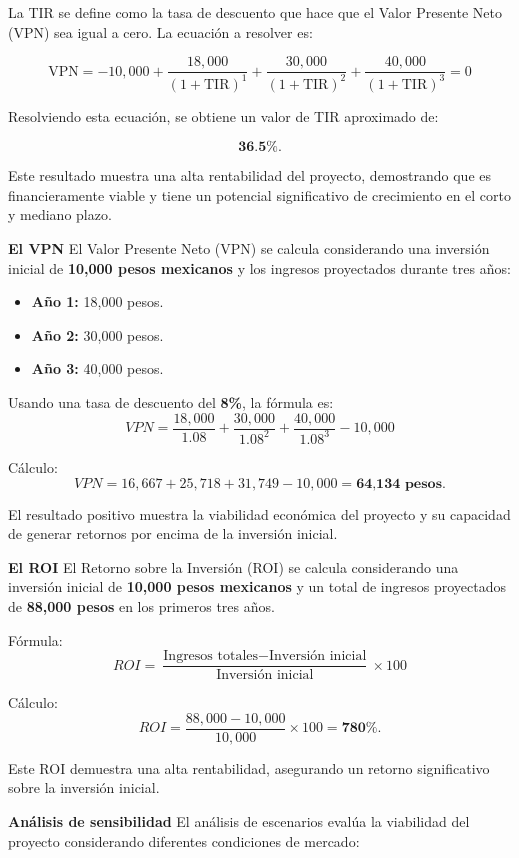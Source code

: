 \documentclass[a4paper,12pt]{article}
\begin{document}
La TIR se define como la tasa de descuento que hace que el Valor Presente Neto (VPN) sea igual a cero. La ecuación a resolver es:

\[
\text{VPN} = -10,000 + \frac{18,000}{(1 + \text{TIR})^1} + \frac{30,000}{(1 + \text{TIR})^2} + \frac{40,000}{(1 + \text{TIR})^3} = 0
\]

Resolviendo esta ecuación, se obtiene un valor de TIR aproximado de:

\[
\textbf{36.5\%}.
\]

Este resultado muestra una alta rentabilidad del proyecto, demostrando que es financieramente viable y tiene un potencial significativo de crecimiento en el corto y mediano plazo.

\textbf{El VPN}
El Valor Presente Neto (VPN) se calcula considerando una inversión inicial de \textbf{10,000 pesos mexicanos} y los ingresos proyectados durante tres años:
\begin{itemize}\setlength{\itemsep}{0pt}\setlength{\parskip}{1pt}
    \item \textbf{Año 1:} 18,000 pesos.
    \item \textbf{Año 2:} 30,000 pesos.
    \item \textbf{Año 3:} 40,000 pesos.
\end{itemize}

Usando una tasa de descuento del \textbf{8\%}, la fórmula es:
\[
VPN = \frac{18,000}{1.08} + \frac{30,000}{1.08^2} + \frac{40,000}{1.08^3} - 10,000
\]

Cálculo:
\[
VPN = 16,667 + 25,718 + 31,749 - 10,000 = \textbf{64,134 pesos}.
\]

El resultado positivo muestra la viabilidad económica del proyecto y su capacidad de generar retornos por encima de la inversión inicial.

\textbf{El ROI}
El Retorno sobre la Inversión (ROI) se calcula considerando una inversión inicial de \textbf{10,000 pesos mexicanos} y un total de ingresos proyectados de \textbf{88,000 pesos} en los primeros tres años. 

Fórmula:
\[
ROI = \frac{\text{Ingresos totales} - \text{Inversión inicial}}{\text{Inversión inicial}} \times 100
\]

Cálculo:
\[
ROI = \frac{88,000 - 10,000}{10,000} \times 100 = \textbf{780\%}.
\]

Este ROI demuestra una alta rentabilidad, asegurando un retorno significativo sobre la inversión inicial.

\textbf{Análisis de sensibilidad}
El análisis de escenarios evalúa la viabilidad del proyecto considerando diferentes condiciones de mercado:
\end{document}
